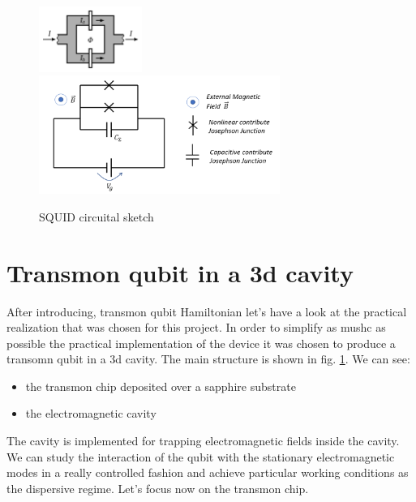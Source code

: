 \begin{figure}[h]
\centering
\includegraphics[width=0.3\textwidth]{pic/transmon/squid1.png}
\includegraphics[width=0.7\textwidth]{pic/transmon/squid2.png}
\caption{SQUID circuital sketch}
\label{fig:squid1}
\end{figure}

\section{Transmon qubit in a 3d cavity}
After introducing, transmon qubit Hamiltonian let's have a look at the practical realization that was chosen for this project. In order to simplify as mushc as possible the practical implementation of the device it was chosen to produce a transomn qubit in a 3d cavity. The main structure is shown in fig. \ref{}. We can see:
\begin{itemize}
    \item the transmon chip deposited over a sapphire substrate
    \item the electromagnetic cavity 
\end{itemize}
The cavity is implemented for trapping electromagnetic fields inside the cavity. We can study the interaction of the qubit with the stationary electromagnetic modes in a really controlled fashion and achieve particular working conditions as the dispersive regime. Let's focus now on the transmon chip.
